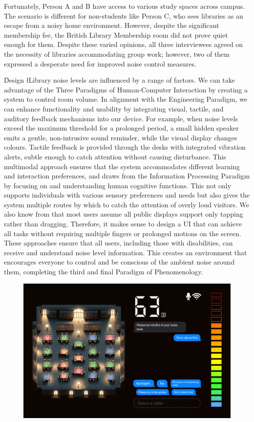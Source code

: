 \documentclass{novel}
\begin{document}
Fortunately, Person A and B have access to various study spaces across campus. The scenario is different for non-students like Person C, who sees libraries as an escape from a noisy home environment. However, despite the significant membership fee, the British Library Membership room did not prove quiet enough for them. Despite these varied opinions, all three interviewees agreed on the necessity of libraries accommodating group work; however, two of them expressed a desperate need for improved noise control measures.

\h{Design}
\l{L}ibrary noise levels are influenced by a range of factors. We can take advantage of the Three Paradigms of Human-Computer Interaction \citep{steve_harrison_three_2007} by creating a system to control room volume. In alignment with the Engineering Paradigm, we can enhance functionality and usability by integrating visual, tactile, and auditory feedback mechanisms into our device. For example, when noise levels exceed the maximum threshold for a prolonged period, a small hidden speaker emits a gentle, non-intrusive sound reminder, while the visual display changes colours. Tactile feedback is provided through the desks with integrated vibration alerts, subtle enough to catch attention without causing disturbance. This multimodal approach ensures that the system accommodates different learning and interaction preferences, and draws from the Information Processing Paradigm by focusing on and understanding human cognitive functions. This not only supports individuals with various sensory preferences and needs but also gives the system multiple routes by which to catch the attention of overly loud visitors. We also know from \cite{marshall_rethinking_2011} that most users assume all public displays support only tapping rather than dragging. Therefore, it makes sense to design a UI that can achieve all tasks without requiring multiple fingers or prolonged motions on the screen. These approaches ensure that all users, including those with disabilities, can receive and understand noise level information. This creates an environment that encourages everyone to control and be conscious of the ambient noise around them, completing the third and final Paradigm of Phenomenology.
\noindent
\begin{figure}[H]
\includegraphics[width=\textwidth]{resources/design.jpg}
\end{figure}
\end{document}
